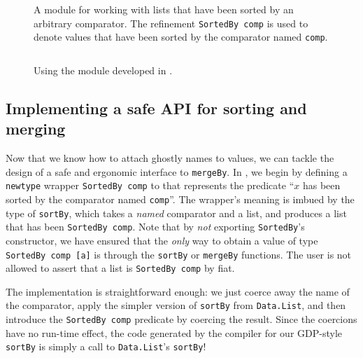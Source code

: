 \documentclass[format=sigplan, review=false, screen=true]{acmart}
\begin{document}

\begin{figure}
  \inputminted{haskell}{ordered.hs}
  \caption{A module for working with lists that have been sorted by an arbitrary
    comparator. The refinement \texttt{SortedBy comp} is used to denote values that
    have been sorted by the comparator named \texttt{comp}.\label{sorted-module}}
\end{figure}


\begin{figure}
  \inputminted{haskell}{usageO.hs}
  \caption{Using the module developed in .\label{sorted-module-demo}}
  \end{figure}

\subsection{Implementing a safe API for sorting and merging}
Now that we know how to attach ghostly names to values, we can tackle the design of a
safe and ergonomic interface to \texttt{mergeBy}. In , we begin by defining
a \texttt{newtype} wrapper \texttt{SortedBy comp} to that represents the predicate
``$x$ has been sorted by the comparator named \texttt{comp}''. The
wrapper's meaning is imbued by the type of \texttt{sortBy}, which takes a \emph{named}
comparator and a list, and produces a list that has been \texttt{SortedBy comp}.
Note that by \emph{not} exporting \texttt{SortedBy}'s constructor, we have ensured that
the \emph{only} way to obtain a value of type \texttt{SortedBy comp [a]} is through the
\texttt{sortBy} or \texttt{mergeBy} functions. The user is not allowed to assert that a
list is \texttt{SortedBy comp} by fiat.

The implementation is straightforward enough: we just coerce away the name of the comparator,
apply the simpler version of \texttt{sortBy} from \texttt{Data.List}, and then
introduce the \texttt{SortedBy comp} predicate by coercing the result. Since the coercions have
no run-time effect, the code generated by the compiler for our GDP-style \texttt{sortBy} is
simply a call to \texttt{Data.List}'s \texttt{sortBy}!
\end{document}
